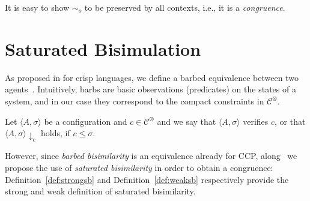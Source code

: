 \documentclass{llncs}
\newcommand{\tell}{{\bf tell}}
\begin{document}
It is easy to show $ \sim_o$ to be preserved by all contexts, i.e., it is a \emph{congruence}.


\section{Saturated Bisimulation}\label{sec:saturated}
As proposed in \cite{pippo} for crisp languages, we define a barbed equivalence between two agents~\cite{barbed}.  
%
Intuitively, barbs are basic observations (predicates) on the states of a system, and in our case they correspond 
to the compact constraints in $\mathcal{C}^\otimes$.

\begin{definition} [Barbs]
Let $\langle A, \sigma \rangle$ be a configuration and $c \in \mathcal{C}^\otimes$
and we say that $\langle A, \sigma \rangle$ verifies $c$, or that $\langle A, \sigma \rangle \downarrow_c$ holds, if  $c \leq \sigma$.
\end{definition}

However, since \emph{barbed bisimilarity} is an equivalence already for CCP, along~\cite{pippo}
we propose the use of \emph{saturated bisimilarity}
in order to obtain a congruence:
%
Definition~\ref{def:strongsb} and Definition~\ref{def:weaksb} respectively provide the strong and weak definition of saturated bisimilarity.
\end{document}
